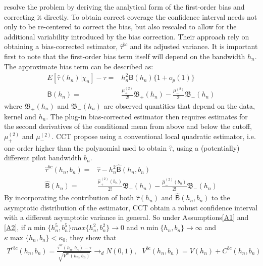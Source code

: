 \documentclass[12pt,fleqn]{article}
\begin{document}
\cite{calonico2014} resolve the problem by deriving the analytical form of the first-order bias and correcting it directly. To obtain correct coverage the confidence interval needs not only to be re-centered to correct the bias, but also rescaled to allow for the additional variability introduced by the bias correction. Their approach rely on obtaining a bias-corrected  estimator, $\hat{\tau}^{bc}$ and its adjusted variance. It is important first to note that the first-order bias term itself will depend on the bandwidth $h_{n}$. The approximate bias term can be described as:
\begin{align*}
     E[\hat{\tau}(h_{n})|\chi_{n}]-\tau=& h_{n}^{2}\mathsf{B}(h_{n})\{1+o_{p}(1)\}\\
     \mathsf{B}(h_{n})=&\frac{\mu_{+}^{(2)}}{2!}\mathfrak{B}_{+}(h_{n})-\frac{\mu_{-}^{(2)}}{2!}\mathfrak{B}_{-}(h_{n})
   \end{align*}
where $\mathfrak{B}_{+}(h_{n})$ and $\mathfrak{B}_{-}(h_{n})$ are observed quantities that depend on the data, kernel and $h_{n}$. The plug-in bias-corrected estimator then requires estimates for the second derivatives of the conditional mean from above and below the cutoff, $\mu_{+}^{(2)}$ and $\mu_{-}^{(2)}$. CCT propose using a conventional local quadratic estimator, i.e. one order higher than the polynomial used to obtain $\hat{\tau}$,  using a (potentially) different pilot bandwidth $b_{n}$.
\begin{align*}
     \hat{\tau}^{bc}(h_{n}, b_{n})=& \hat{\tau}-h_{n}^{2}\hat{\mathsf{B}}(h_{n},b_{n})\\
     \hat{\mathsf{B}}(h_{n})=&\frac{\hat{\mu}_{+}^{(2)}(b_{n})}{2!}\mathfrak{B}_{+}(h_{n})-\frac{\hat{\mu}_{-}^{(2)}(b_{n})}{2!}\mathfrak{B}_{-}(h_{n})
   \end{align*}
By incorporating the contribution of both $\hat{\tau}(h_{n})$ and $\hat{\mathsf{B}}(h_{n},b_{n})$ to the asymptotic distribution of the estimator, CCT obtain a robust confidence interval with a different asymptotic variance in general. So under Assumptions\ref{A1} and \ref{A2}, if $n\min\{h_{n}^{5}, b_{n}^{5}\}max\{h_{n}^{2}, b_{n}^{2}\}\rightarrow 0$ and $n\min\{h_{n}, b_{n}\}\rightarrow \infty$ and $\kappa \max\{h_{n},b_{n}\}< \kappa_{0}$, they show that
\begin{align}
  T^{rbc}(h_{n}, b_{n})=\frac{\hat{\tau}^{bc}(h_{n}, b_{n})-\tau}{\sqrt{V^{bc}(h_{n}, b_{n})}}\rightarrow_{d}N(0,1), \text{        }V^{bc}(h_{n}, b_{n})=V(h_{n})+C^{bc}(h_{n}, b_{n})\\
 \end{align}
\end{document}
